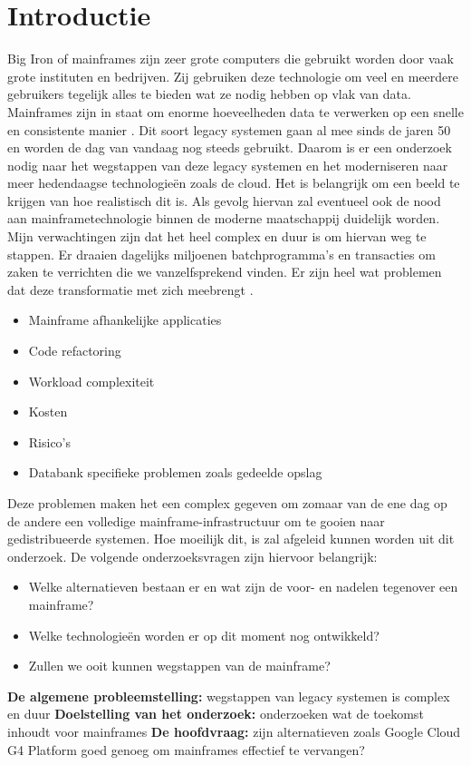 
\section{Introductie} %
\label{sec:introductie}
Big Iron of mainframes zijn zeer grote computers die gebruikt worden door vaak grote instituten en bedrijven. Zij gebruiken deze technologie om veel en meerdere gebruikers tegelijk alles te bieden wat ze nodig hebben op vlak van data. Mainframes zijn in staat om enorme hoeveelheden data te verwerken op een snelle en consistente manier \autocite{Ebbers2016}. Dit soort legacy systemen gaan al mee sinds de jaren 50 en worden de dag van vandaag nog steeds gebruikt. Daarom is er een onderzoek nodig naar het wegstappen van deze legacy systemen en het moderniseren naar meer hedendaagse technologieën zoals de cloud. Het is belangrijk om een beeld te krijgen van hoe realistisch dit is. Als gevolg hiervan zal eventueel ook de nood aan mainframetechnologie binnen de moderne maatschappij duidelijk worden. Mijn verwachtingen zijn dat het heel complex en duur is om hiervan weg te stappen. Er draaien dagelijks miljoenen batchprogramma’s en transacties om zaken te verrichten die we vanzelfsprekend vinden. Er zijn heel wat problemen dat deze transformatie met zich meebrengt  \autocite{Long2018}.
\begin{itemize}
    \item Mainframe afhankelijke applicaties
    \item Code refactoring
    \item Workload complexiteit
    \item Kosten
    \item Risico's
    \item Databank specifieke problemen zoals gedeelde opslag
\end{itemize}
Deze problemen maken het een complex gegeven om zomaar van de ene dag op de andere een volledige mainframe-infrastructuur om te gooien naar gedistribueerde systemen. Hoe moeilijk dit, is zal afgeleid kunnen worden uit dit onderzoek. De volgende onderzoeksvragen zijn hiervoor belangrijk:
\begin{itemize}
    \item Welke alternatieven bestaan er en wat zijn de voor- en nadelen tegenover een mainframe?
    \item Welke technologieën worden er op dit moment nog ontwikkeld?
    \item Zullen we ooit kunnen wegstappen van de mainframe?
\end{itemize}
\textbf{De algemene probleemstelling:} wegstappen van legacy systemen is complex en duur \newline
\textbf{Doelstelling van het onderzoek:} onderzoeken wat de toekomst inhoudt voor mainframes \newline
\textbf{De hoofdvraag:} zijn alternatieven zoals Google Cloud G4 Platform goed genoeg om mainframes effectief te vervangen?

